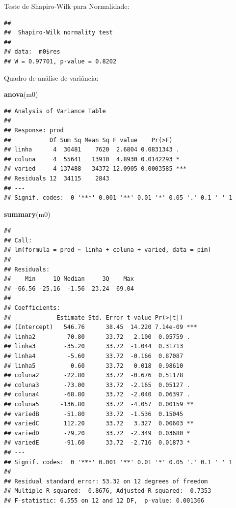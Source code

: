 \documentclass[
]{book}
\newenvironment{Shaded}{\begin{snugshade}}{\end{snugshade}}
\newcommand{\KeywordTok}[1]{\textcolor[rgb]{0.13,0.29,0.53}{\textbf{#1}}}
\newcommand{\NormalTok}[1]{#1}
\newcommand{\OperatorTok}[1]{\textcolor[rgb]{0.81,0.36,0.00}{\textbf{#1}}}
\begin{document}
Teste de Shapiro-Wilk para Normalidade:

\begin{Shaded}
\end{Shaded}

\begin{verbatim}
## 
##  Shapiro-Wilk normality test
## 
## data:  m0$res
## W = 0.97701, p-value = 0.8202
\end{verbatim}

Quadro de análise de variância:

\begin{Shaded}
\begin{Highlighting}[]
\KeywordTok{anova}\NormalTok{(m0)}
\end{Highlighting}
\end{Shaded}

\begin{verbatim}
## Analysis of Variance Table
## 
## Response: prod
##           Df Sum Sq Mean Sq F value    Pr(>F)    
## linha      4  30481    7620  2.6804 0.0831343 .  
## coluna     4  55641   13910  4.8930 0.0142293 *  
## varied     4 137488   34372 12.0905 0.0003585 ***
## Residuals 12  34115    2843                      
## ---
## Signif. codes:  0 '***' 0.001 '**' 0.01 '*' 0.05 '.' 0.1 ' ' 1
\end{verbatim}

\begin{Shaded}
\begin{Highlighting}[]
\KeywordTok{summary}\NormalTok{(m0)}
\end{Highlighting}
\end{Shaded}

\begin{verbatim}
## 
## Call:
## lm(formula = prod ~ linha + coluna + varied, data = pim)
## 
## Residuals:
##    Min     1Q Median     3Q    Max 
## -66.56 -25.16  -1.56  23.24  69.04 
## 
## Coefficients:
##             Estimate Std. Error t value Pr(>|t|)    
## (Intercept)   546.76      38.45  14.220 7.14e-09 ***
## linha2         70.80      33.72   2.100  0.05759 .  
## linha3        -35.20      33.72  -1.044  0.31713    
## linha4         -5.60      33.72  -0.166  0.87087    
## linha5          0.60      33.72   0.018  0.98610    
## coluna2       -22.80      33.72  -0.676  0.51178    
## coluna3       -73.00      33.72  -2.165  0.05127 .  
## coluna4       -68.80      33.72  -2.040  0.06397 .  
## coluna5      -136.80      33.72  -4.057  0.00159 ** 
## variedB       -51.80      33.72  -1.536  0.15045    
## variedC       112.20      33.72   3.327  0.00603 ** 
## variedD       -79.20      33.72  -2.349  0.03680 *  
## variedE       -91.60      33.72  -2.716  0.01873 *  
## ---
## Signif. codes:  0 '***' 0.001 '**' 0.01 '*' 0.05 '.' 0.1 ' ' 1
## 
## Residual standard error: 53.32 on 12 degrees of freedom
## Multiple R-squared:  0.8676, Adjusted R-squared:  0.7353 
## F-statistic: 6.555 on 12 and 12 DF,  p-value: 0.001366
\end{verbatim}
\end{document}
